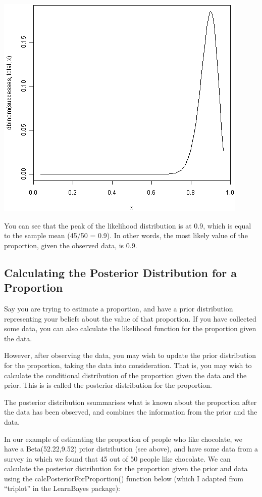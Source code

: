 \documentclass[a4paper,10pt,english]{sphinxmanual}
\begin{document}
\includegraphics{image2.png}

You can see that the peak of the likelihood distribution is at 0.9, which is equal to the
sample mean (45/50 = 0.9). In other words, the most likely value of the proportion, given the
observed data, is 0.9.


\subsection{Calculating the Posterior Distribution for a Proportion}
\label{src/bayesianstats:calculating-the-posterior-distribution-for-a-proportion}
Say you are trying to estimate a proportion, and have a prior distribution representing
your beliefs about the value of that proportion. If you have collected some data, you
can also calculate the likelihood function for the proportion given the data.

However, after observing the data, you may wish to update the prior distribution for
the proportion, taking the data into consideration. That is, you may wish to calculate
the conditional distribution of the proportion given the data and the prior. This is is called
the posterior distribution for the proportion.

The posterior distribution ssummarises what is known about the proportion after the data
has been observed, and combines the information from the prior and the data.

In our example of estimating the proportion of people who like chocolate, we have a Beta(52.22,9.52) prior
distribution (see above), and have some data from a survey in which we found that 45 out of 50 people like
chocolate. We can calculate the posterior distribution for the proportion given the prior and data using
the calcPosteriorForProportion() function below (which I adapted from ``triplot'' in the LearnBayes
package):
\end{document}
